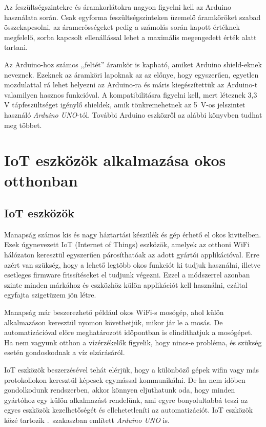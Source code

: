 \documentclass{thesis-ekf}
\theoremstyle{definition}
\begin{document}
Az feszültségszintekre és áramkorlátokra nagyon figyelni kell az Arduino használata során. Csak egyforma feszültségszinteken üzemelő áramköröket szabad összekapcsolni, az áramerősségeket pedig a számolás során kapott értéknek megfelelő, sorba kapcsolt ellenállással lehet a maximális megengedett érték alatt tartani.

Az Arduino-hoz számos ,,feltét'' áramkör is kapható, amiket Arduino shield-eknek neveznek. Ezeknek az áramköri lapoknak az az előnye, hogy egyszerűen, egyetlen mozdulattal rá lehet helyezni az Arduino-ra és máris kiegészítettük az Arduino-t valamilyen hasznos funkcióval. A kompatibilitásra figyelni kell, mert léteznek 3,3\,V tápfeszültséget igénylő shieldek, amik tönkremehetnek az 5~V-os jelszintet használó \emph{Arduino UNO}-tól.
További Arduino eszközről az alábbi könyvben tudhat meg többet.\cite[8--12.oldal]{arduinoBook}

\chapter{IoT eszközök alkalmazása okos otthonban}\label{smarthomeChapter}
\section{IoT eszközök}
Manapság számos kis és nagy háztartási készülék és gép érhető el okos kivitelben. Ezek úgynevezett IoT (Internet of Things) eszközök, amelyek az otthoni WiFi hálózaton keresztül egyszerűen párosíthatóak az adott gyártói applikációval. Erre azért van szükség, hogy a lehető legtöbb okos funkciót ki tudjuk használni, illetve esetleges firmware frissítéseket el tudjunk végezni. Ezzel a módszerrel azonban szinte minden márkához és eszközhöz külön applikációt kell használni, ezáltal egyfajta szigetüzem jön létre.

Manapság már beszerezhető például okos WiFi-s mosógép, ahol külön alkalmazáson keresztül nyomon követhetjük, mikor jár le a mosás. De automatizációval előre meghatározott időpontban is elindíthatjuk a mosógépet. Ha nem vagyunk otthon a vízérzékelők figyelik, hogy nincs-e probléma, és szükség esetén gondoskodnak a víz elzárásáról.

IoT eszközök beszerzésével tehát elérjük, hogy a különböző gépek wifin vagy más protokollokon keresztül képesek egymással kommunikálni. De ha nem időben gondolkodunk rendszerben, akkor könnyen eljuthatunk oda, hogy minden gyártóhoz egy külön alkalmazást rendelünk, ami egyre bonyolultabbá teszi az egyes eszközök kezelhetőségét és ellehetetleníti az automatizációt. IoT eszközök közé tartozik .~szakaszban említett \emph{Arduino UNO} is.
\end{document}

